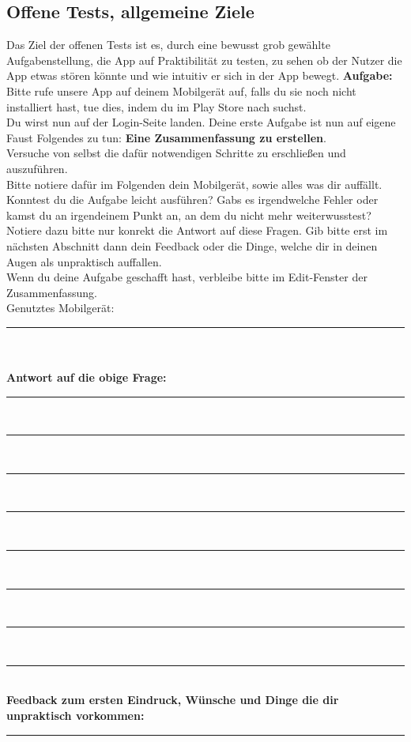 \subsection{Offene Tests, allgemeine Ziele}
Das Ziel der offenen Tests ist es, durch eine bewusst grob gewählte Aufgabenstellung, die App auf Praktibilität zu testen, zu sehen ob der Nutzer die App etwas stören könnte und wie intuitiv er sich in der App bewegt.\newline
\textbf{Aufgabe:}\newline
Bitte rufe unsere App auf deinem Mobilgerät auf, falls du sie noch nicht installiert hast, tue dies, indem du im Play Store nach  suchst.\\
Du wirst nun auf der Login-Seite landen. Deine erste Aufgabe ist nun auf eigene Faust Folgendes zu tun: \textbf{Eine Zusammenfassung zu erstellen}.\\Versuche von selbst die dafür notwendigen Schritte zu erschließen und auszuführen.\\
Bitte notiere dafür im Folgenden dein Mobilgerät, sowie alles was dir auffällt. Konntest du die Aufgabe leicht ausführen? Gabs es irgendwelche Fehler oder kamst du an irgendeinem Punkt an, an dem du nicht mehr weiterwusstest?\\
Notiere dazu bitte nur konrekt die Antwort auf diese Fragen. Gib bitte erst im nächsten Abschnitt dann dein Feedback oder die Dinge, welche dir in deinen Augen als unpraktisch auffallen.\\
Wenn du deine Aufgabe geschafft hast, verbleibe bitte im Edit-Fenster der Zusammenfassung.\\
Genutztes Mobilgerät: \rule{0.25\textwidth}{0.4pt}\\\\
\textbf{Antwort auf die obige Frage:}\\
\noindent\rule{\textwidth}{0.4pt}\\
\noindent\rule{\textwidth}{0.4pt}\\
\noindent\rule{\textwidth}{0.4pt}\\
\noindent\rule{\textwidth}{0.4pt}\\
\noindent\rule{\textwidth}{0.4pt}\\
\noindent\rule{\textwidth}{0.4pt}\\
\noindent\rule{\textwidth}{0.4pt}\\
\noindent\rule{\textwidth}{0.4pt}\\
\textbf{Feedback zum ersten Eindruck, Wünsche und Dinge die dir unpraktisch vorkommen:}
\noindent\rule{\textwidth}{0.4pt}\\
